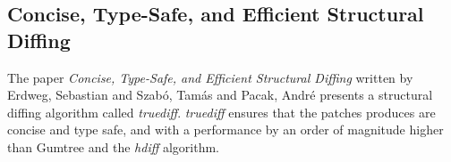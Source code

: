 \subsection{Concise, Type-Safe, and Efficient Structural Diffing}

The paper \textit{Concise, Type-Safe, and Efficient Structural Diffing} written by Erdweg, Sebastian and Szab{\'o}, Tam{\'a}s and Pacak, Andr{\'e} presents a structural diffing algorithm called \textit{truediff}\cite{erdweg2021concise}. \textit{truediff} ensures that the patches produces are concise and type safe, and with a performance by an order of magnitude higher than Gumtree\cite{falleri2014gumtree} and the \textit{hdiff}\cite{miraldo2019efficient} algorithm.

